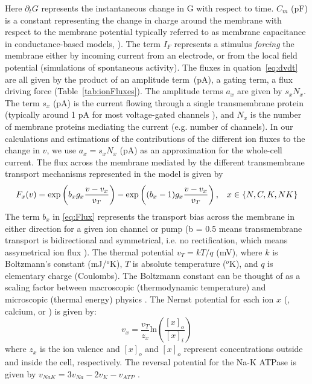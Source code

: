 \documentclass[10pt]{article}
\begin{document}
Here $\partial_t G$ represents the instantaneous change in G with respect to time. $C_m$ (pF) is a constant representing the change in charge around the membrane with respect to the membrane potential typically referred to as membrane capacitance in conductance-based models, \cite{herrera2020nonequivalent}). The term $I_{F}$ represents a stimulus \textit{forcing} the membrane either by incoming current from an electrode, or from the local field potential (simulations of spontaneous activity). 
The fluxes in quation~\eqref{eq:dvdt} are all given by the product of an amplitude term~(pA), a gating term,  a flux driving force (Table~\ref{tab:ionFluxes}). The amplitude terms $a_x$  are given by $s_x N_x$. The term
$s_x$ (pA) is the current flowing through a single transmembrane protein (typically around 1 pA for most voltage-gated channels \citep{hille2001ion}), and $N_x$ is the number of membrane proteins mediating the current (e.g. {number of \kalium channels}). In our calculations and estimations of the contributions of the different ion fluxes to the change in $v$, we use $a_x = s_x N_x$ (pA) as an approximation for the whole-cell current.  
The flux across the membrane mediated by the different transmembrane transport mechanisms represented in the model is given by  
\begin{equation}
F_x(v) = \textrm{exp} \left(b_xg_x\frac{v-v_x}{v_T}\right) - \textrm{exp} \left((b_x-1)g_x\frac{v-v_x}{v_T}\right), \hspace{0.3cm} x \in \left\{N, C, K, NK\right\} 
\label{eq:Flux}
\end{equation}
The term  
$b_x$ in \eqref{eq:Flux}  represents the transport bias across the membrane in either direction for a given ion channel or pump (b = 0.5 means transmembrane transport is bidirectional and symmetrical, i.e. no rectification, which means assymetrical ion flux \citep{herrera2018thermodynamic}). The thermal potential $v_T=kT/q$ (mV), where $k$ is Boltzmann's constant (mJ/$^o$K), $T$ is absolute temperature ($^o$K), and $q$ is elementary charge  (Coulombs). The Boltzmann constant can be thought of as a scaling factor between macroscopic (thermodynamic temperature) and microscopic (thermal energy) physics \citep{kalinin2005boltzmann}. The Nernst potential for each ion $x$ ({\natrium}, {\\calcium}, or {\kalium}) is given by: 
\begin{equation}
v_x = \frac{v_T}{z_x} \textrm{ln} \left(\frac{[x]_o}{[x]_i} \right)
\end{equation}
where $z_x$ is the ion valence and $[x]_o$ and $[x]_o$ represent concentrations outside and inside the cell, respectively. The reversal potential for the Na-K ATPase is given by $v_{NaK}=3v_{Na}-2v_{K} - v_{ATP}$ \citep{herrera2018thermodynamic}.
\end{document}
